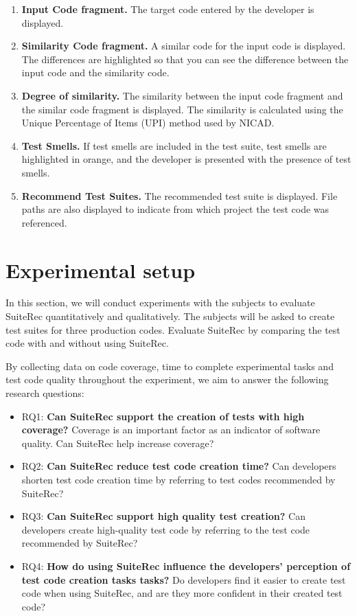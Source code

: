 \documentclass[conference]{IEEEtran}
\begin{document}
 \begin{enumerate}
\renewcommand{\labelenumi}{(\arabic{enumi})}
\item{\textbf{Input Code fragment. }The target code entered by the developer is displayed.}
\item{\textbf{Similarity Code fragment. }A similar code for the input code is displayed. The differences are highlighted so that you can see the difference between the input code and the similarity code.}
\item{\textbf{Degree of similarity. }The similarity between the input code fragment and the similar code fragment is displayed. The similarity is calculated using the Unique Percentage of Items (UPI) method used by NICAD. }
\item{\textbf{Test Smells. }If test smells are included in the test suite, test smells are highlighted in orange, and the developer is presented with the presence of test smells. }
\item{\textbf{Recommend Test Suites. }The recommended test suite is displayed. File paths are also displayed to indicate from which project the test code was referenced. }
\end{enumerate}


\section{Experimental setup}
In this section, we will conduct experiments with the subjects to evaluate SuiteRec quantitatively and qualitatively. The subjects will be asked to create test suites for three production codes. Evaluate SuiteRec by comparing the test code with and without using SuiteRec. 

By collecting data on code coverage, time to complete experimental tasks and test code quality throughout the experiment, we aim to answer the following research questions:


\begin{itemize}
\item RQ1: \textbf{Can SuiteRec support the creation of tests with high coverage?} Coverage is an important factor as an indicator of software quality. Can SuiteRec help increase coverage?
\item RQ2: \textbf{Can SuiteRec reduce test code creation time?} Can developers shorten test code creation time by referring to test codes recommended by SuiteRec?
\item RQ3: \textbf{Can SuiteRec support high quality test creation?} Can developers create high-quality test code by referring to the test code recommended by SuiteRec?
\item RQ4: \textbf{How do using SuiteRec influence the developers’ perception of test code creation tasks tasks? } Do developers find it easier to create test code when using SuiteRec, and are they more confident in their created test code?
\end{itemize}
\end{document}
